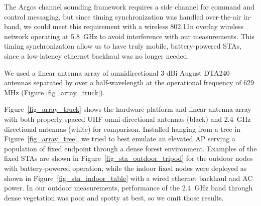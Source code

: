 	The Argos channel sounding framework requires a side channel for command and control messaging, but since timing synchronization was handled over-the-air in-band, we could meet this requirement with a wireless 802.11n overlay wireless network operating at 5.8~GHz to avoid interference with our measurements.
	This timing synchronization allow us to have truly mobile, battery-powered \acp{STA}, since a low-latency ethernet backhaul was no longer needed.

	We used a linear antenna array of omnidirectional 3 dBi August DTA240 antennas separated by over a half-wavelength at the operational frequency of 629 MHz (Figure \ref{fig_array_truck}).


	Figure~\ref{fig_array_truck} shows the hardware platform and linear antenna array with both properly-spaced UHF omni-directional antennas (black) and 2.4~GHz directional antennas (white) for comparison.
	Installed hanging from a tree in Figure~\ref{fig_array_tree}, we tried to best emulate an elevated \ac{AP} serving a population of fixed endpoint through a dense forest environment.
	Examples of the fixed \acp{STA} are shown in Figure~\ref{fig_sta_outdoor_tripod} for the outdoor nodes with battery-powered operation, while the indoor fixed nodes were deployed as shown in Figure~\ref{fig_sta_indoor_table} with a wired ethernet backhaul and AC power.
	In our outdoor measurements, performance of the 2.4~GHz band through dense vegetation was poor and spotty at best, so we omit those results.


